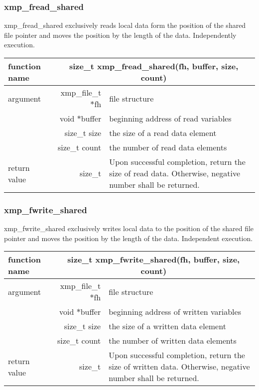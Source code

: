    \subsubsection{xmp\_fread\_shared}
   xmp\_fread\_shared exclusively reads local data form the position of the shared file
   pointer and moves the position by the length of the data.
   Independently execution.

   \begin{table}[h]
    \begin{center}
     \begin{tabular}{|l|r|p{80mm}|}
      \hline
      {\bf function name}  & \multicolumn{2}{c|}{\bf size\_t
      xmp\_fread\_shared(fh, buffer, size, count)}  \\ \hline \hline
      argument & xmp\_file\_t $*$fh & file structure \\ \cline{2-3}
      & void $*$buffer & beginning address of read variables \\ \cline{2-3}
      & size\_t size & the size of a read data element \\ \cline{2-3}
      & size\_t count & the number of read data elements \\ \hline
      return value & size\_t & Upon successful completion, return the size
	      of read data. Otherwise, negative number shall be
	      returned. \\ \hline
      \end{tabular}
     \end{center}
    \label{tb:aaa}
   \end{table}

   \subsubsection{xmp\_fwrite\_shared}
   xmp\_fwrite\_shared exclusively writes local data to the
   position of the shared file pointer and moves the position by the length of the data.
   Independent execution.

   \begin{table}[h]
    \begin{center}
     \begin{tabular}{|l|r|p{80mm}|}
      \hline
      {\bf function name}  & \multicolumn{2}{c|}{\bf size\_t
        xmp\_fwrite\_shared(fh, buffer, size, count)} \\ \hline \hline
      argument & xmp\_file\_t $*$fh & file structure \\ \cline{2-3}
      & void $*$buffer & beginning address of written variables \\ \cline{2-3}
      & size\_t size & the size of a written data element \\ \cline{2-3}
      & size\_t count & the number of written data elements \\ \hline
      return value & size\_t & Upon successful completion, return the size
	      of written data. Otherwise, negative number shall be
	      returned. \\ \hline
      \end{tabular}
     \end{center}
    \label{tb:aaa}
   \end{table}


